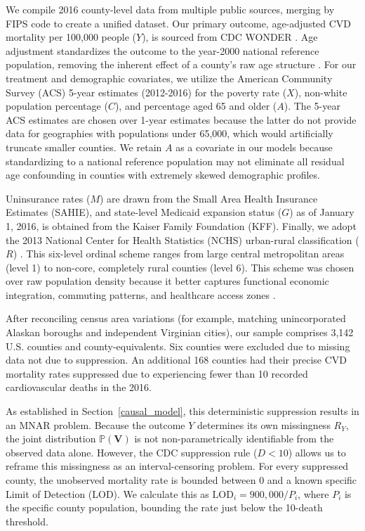 \documentclass{article}
\theoremstyle{plain}
\theoremstyle{definition}
\theoremstyle{remark}
\begin{document}
We compile 2016 county-level data from multiple public sources, 
merging by FIPS code to create a unified dataset. Our primary 
outcome, age-adjusted CVD mortality per 100,000 people ($Y$), is sourced from 
CDC WONDER \citep{cdc_wonder_cmf_data}. Age adjustment standardizes the outcome 
to the year-2000 national reference population, removing the inherent effect 
of a county's raw age structure \citep{anderson1998age}. For our treatment and 
demographic covariates, we utilize the American Community Survey (ACS) 5-year 
estimates (2012-2016) for the poverty rate ($X$), non-white population percentage 
($C$), and percentage aged 65 and older ($A$). The 5-year ACS estimates are chosen over 1-year estimates because the latter do not provide data 
for geographies with populations under 65,000, which would artificially truncate 
smaller counties. We retain $A$ as a covariate in our models because 
standardizing to a national reference population may not eliminate 
all residual age confounding in counties with extremely skewed demographic profiles.

Uninsurance rates ($M$) are drawn from the Small Area Health Insurance Estimates 
(SAHIE), and state-level Medicaid expansion status ($G$) as of January 1, 2016, is 
obtained from the Kaiser Family Foundation (KFF). Finally, we adopt the 2013 
National Center for Health Statistics (NCHS) urban-rural classification ($R$) 
\citep{ingram20142013}. This six-level ordinal scheme ranges from large central 
metropolitan areas (level 1) to non-core, completely rural counties (level 6). 
This scheme was chosen over raw population density because it better 
captures functional economic integration, commuting patterns, and 
healthcare access zones \citep{office20212020}.

After reconciling census area variations (for example, matching unincorporated Alaskan 
boroughs and independent Virginian cities), our sample 
comprises 3,142 U.S. counties and county-equivalents. Six counties were 
excluded due to missing data not due to suppression. An 
additional 168 counties had their precise CVD mortality rates suppressed due to 
experiencing fewer than 10 recorded cardiovascular deaths in the 2016.

As established in Section~\ref{causal_model}, this deterministic 
suppression results in an MNAR problem. Because the outcome $Y$ 
determines its own missingness $R_Y$, the joint distribution $\mathbb{P}(\mathbf{V})$ 
is not non-parametrically identifiable from the observed data alone. However, the CDC suppression rule ($D < 10$) allows us 
to reframe this missingness as an interval-censoring problem. 
For every suppressed county, the unobserved mortality rate is bounded 
between 0 and a known specific Limit of Detection (LOD). We calculate 
this as $\text{LOD}_i = 900,000 / P_i$, where $P_i$ is the specific county population, bounding the rate just below the 10-death threshold.
\end{document}
